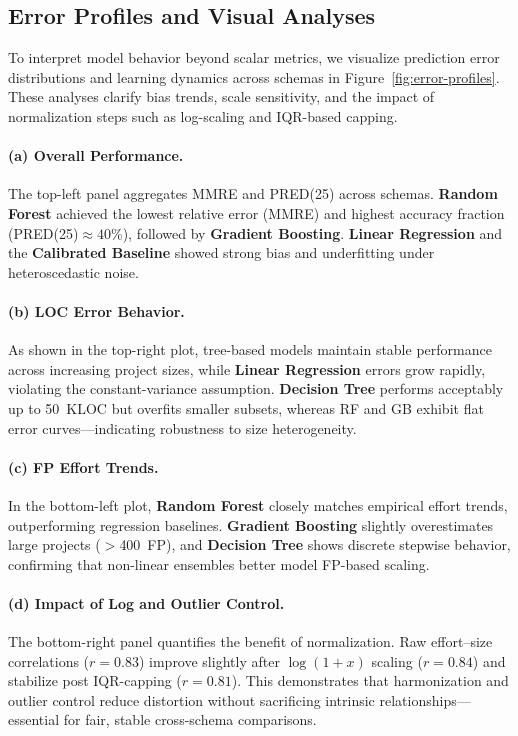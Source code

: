 \documentclass{ieeeaccess}
\begin{document}
\subsection{Error Profiles and Visual Analyses}


To interpret model behavior beyond scalar metrics, 
we visualize prediction error distributions and learning dynamics 
across schemas in Figure~\ref{fig:error-profiles}.  
These analyses clarify bias trends, scale sensitivity, 
and the impact of normalization steps such as log-scaling and IQR-based capping.

\paragraph{(a) Overall Performance.}
The top-left panel aggregates MMRE and PRED(25) across schemas.  
\textbf{Random Forest} achieved the lowest relative error (MMRE) 
and highest accuracy fraction (PRED(25)$\approx40\%$), 
followed by \textbf{Gradient Boosting}.  
\textbf{Linear Regression} and the \textbf{Calibrated Baseline} showed 
strong bias and underfitting under heteroscedastic noise.

\paragraph{(b) LOC Error Behavior.}
As shown in the top-right plot, tree-based models maintain 
stable performance across increasing project sizes, 
while \textbf{Linear Regression} errors grow rapidly, 
violating the constant-variance assumption.  
\textbf{Decision Tree} performs acceptably up to 50~KLOC 
but overfits smaller subsets, whereas RF and GB exhibit 
flat error curves---indicating robustness to size heterogeneity.

\paragraph{(c) FP Effort Trends.}
In the bottom-left plot, \textbf{Random Forest} closely matches 
empirical effort trends, outperforming regression baselines.  
\textbf{Gradient Boosting} slightly overestimates large projects ($>$400~FP), 
and \textbf{Decision Tree} shows discrete stepwise behavior, 
confirming that non-linear ensembles better model FP-based scaling.

\paragraph{(d) Impact of Log and Outlier Control.}
The bottom-right panel quantifies the benefit of normalization.  
Raw effort--size correlations ($r=0.83$) improve slightly after $\log(1+x)$ scaling ($r=0.84$) 
and stabilize post IQR-capping ($r=0.81$).  
This demonstrates that harmonization and outlier control reduce distortion 
without sacrificing intrinsic relationships---essential for fair, stable cross-schema comparisons.
\end{document}
